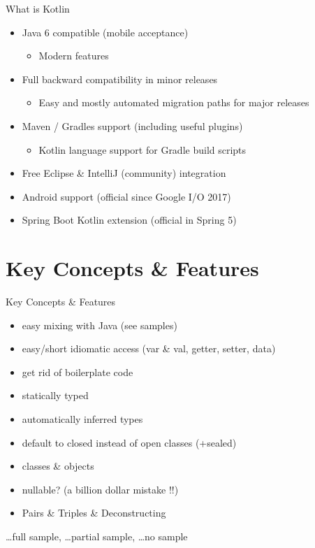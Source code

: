 \begin{frame}{What is Kotlin}
	\begin{itemize}
		\item Java 6 compatible (mobile acceptance)
		\begin{itemize}
			\item Modern features 
		\end{itemize}
		\item Full backward compatibility in minor releases
		\begin{itemize}
			\item Easy and mostly automated migration paths for major releases 
		\end{itemize}
		\item Maven / Gradles support (including useful plugins)
		\begin{itemize}
			\item Kotlin language support for Gradle build scripts
		\end{itemize}
		\item Free Eclipse \& IntelliJ (community) integration
		\item Android support (official since Google I/O 2017)
		\item Spring Boot Kotlin extension (official in Spring 5)
	\end{itemize}
\end{frame}

\section{Key Concepts \& Features}

\begin{frame}{Key Concepts \& Features}
	\begin{itemize}
		\item easy mixing with Java (see samples) \cmark
		\item easy/short idiomatic access (var \& val, getter, setter, data) \cmark
		\item get rid of boilerplate code \cmark
		\item statically typed \cmark
		\item automatically inferred types \cmark
		\item default to closed instead of open classes (+sealed) \tmark
		\item classes \& objects \tmark
		\item nullable? (a billion dollar mistake !!) \cmark
		\item Pairs \& Triples \& Deconstructing \cmark
	\end{itemize}
\cmark \dots full sample, \tmark \dots partial sample, \xmark \dots no sample
\end{frame}


